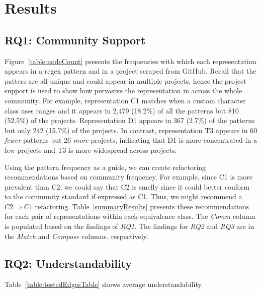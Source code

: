 \section{Results}
\label{sec:results}





\subsection{RQ1: Community Support}
Figure~\ref{table:nodeCount} presents the frequencies with which each representation appears in a regex pattern and in a project scraped from GitHub. Recall that the patters are all unique and could appear in multiple projects, hence the project support is used to show how pervasive the representation in across the whole community. For example, representation C1 matches when a custom character class uses ranges and it appears in 2,479 (18.2\%) of all the patterns but 810 (52.5\%) of the projects. Representation D1 appears in 367 (2.7\%) of the patterns but only 242 (15.7\%) of the projects. In contrast, representation T3 appears in 60 \emph{fewer} patterns but 26 \emph{more} projects, indicating that D1 is more concentrated in a few projects and T3 is more widespread across projects.

Using the pattern frequency as a guide, we can create refactoring recommendations based on community frequency. For example, since C1 is more prevalent than C2, we could say that C2 is smelly since it could better conform to the community standard if expressed as C1. Thus, we might recommend a $C2 \Rightarrow C1$ refactoring. Table~\ref{summaryResults} presents these recommendations for each pair of representations within each equivalence class. The \emph{Comm} column is populated based on the findings of \emph{RQ1}. The findings for \emph{RQ2} and \emph{RQ3} are in the \emph{Match} and \emph{Compose} columns, respectively.




\subsection{RQ2: Understandability}
Table~\ref{table:testedEdgesTable} shows average understandability.







